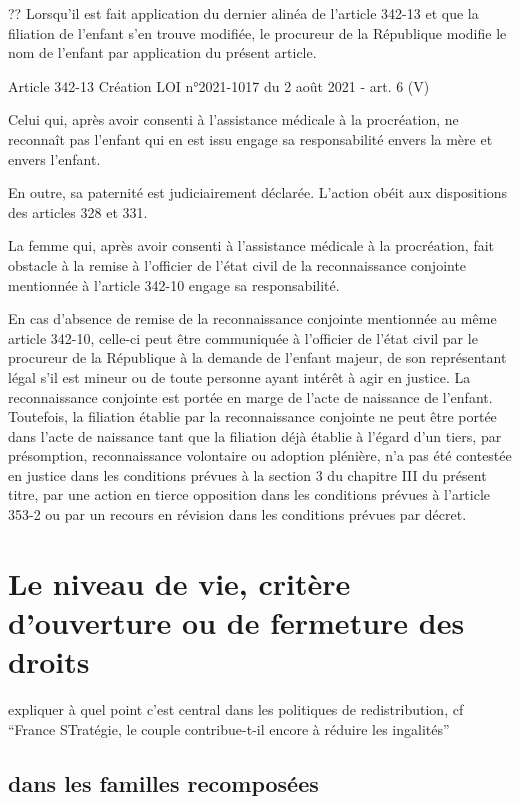 \documentclass[
  12pt,
]{book}
\begin{document}
\begin{encadre}{??}
Lorsqu'il est fait application du dernier alinéa de l'article 342-13 et que la filiation de l'enfant s'en trouve modifiée, le procureur de la République modifie le nom de l'enfant par application du présent article.

Article 342-13
Création LOI n°2021-1017 du 2 août 2021 - art. 6 (V)

Celui qui, après avoir consenti à l'assistance médicale à la procréation, ne reconnaît pas l'enfant qui en est issu engage sa responsabilité envers la mère et envers l'enfant.

En outre, sa paternité est judiciairement déclarée. L'action obéit aux dispositions des articles 328 et 331.

La femme qui, après avoir consenti à l'assistance médicale à la procréation, fait obstacle à la remise à l'officier de l'état civil de la reconnaissance conjointe mentionnée à l'article 342-10 engage sa responsabilité.

En cas d'absence de remise de la reconnaissance conjointe mentionnée au même article 342-10, celle-ci peut être communiquée à l'officier de l'état civil par le procureur de la République à la demande de l'enfant majeur, de son représentant légal s'il est mineur ou de toute personne ayant intérêt à agir en justice. La reconnaissance conjointe est portée en marge de l'acte de naissance de l'enfant. Toutefois, la filiation établie par la reconnaissance conjointe ne peut être portée dans l'acte de naissance tant que la filiation déjà établie à l'égard d'un tiers, par présomption, reconnaissance volontaire ou adoption plénière, n'a pas été contestée en justice dans les conditions prévues à la section 3 du chapitre III du présent titre, par une action en tierce opposition dans les conditions prévues à l'article 353-2 ou par un recours en révision dans les conditions prévues par décret.

\end{encadre}

\section{Le niveau de vie, critère d'ouverture ou de fermeture des
droits}\label{le-niveau-de-vie-crituxe8re-douverture-ou-de-fermeture-des-droits}

expliquer à quel point c'est central dans les politiques de
redistribution, cf ``France STratégie, le couple contribue-t-il encore à
réduire les ingalités''

\subsection{dans les familles
recomposées}\label{dans-les-familles-recomposuxe9es}
\end{document}
